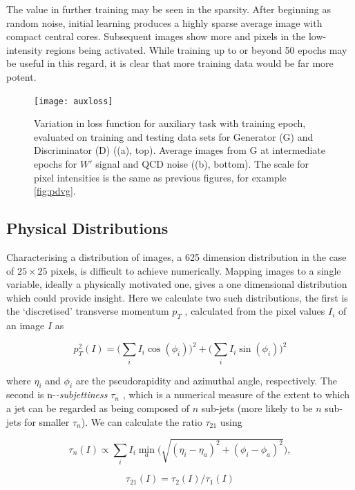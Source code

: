 \documentclass[twocolumn]{article}
\begin{document}
The value in further training may be seen in the sparsity. After beginning as random noise, initial learning produces a highly sparse average image with compact central cores. Subsequent images show more and pixels in the low-intensity regions being activated. While training up to or beyond 50 epochs may be useful in this regard, it is clear that more training data would be far more potent.

	\begin{figure}[!htbp]
		\centering
		\texttt{[image: auxloss]}
		
		\caption{Variation in loss function for auxiliary task with training epoch, evaluated on training and testing data sets for Generator (G) and Discriminator (D) ((a), top). Average images from G at intermediate epochs for $W'$ signal and QCD noise ((b), bottom). The scale for pixel intensities is the same as previous figures, for example \cref{fig:pdvg}.} 
		\label{fig:auxloss}
		
	\end{figure} 

\subsection{Physical Distributions}
\label{sec:physical}
Characterising a distribution of images, a 625 dimension distribution in the case of $25\times25$ pixels, is difficult to achieve numerically. Mapping images to a single variable, ideally a physically motivated one, gives a one dimensional distribution which could provide insight. Here we calculate two such distributions, the first is the `discretised' transverse momentum $p_T$ \cite{de2017learning}, calculated from the pixel values $I_i$ of an image $I$ as 

$$
p_T^2(I) = \bigg(\sum_i I_i \cos(\phi_i)\bigg)^2 + \bigg(\sum_i I_i \sin(\phi_i)\bigg)^2
$$

where $\eta_i$ and $\phi_i$ are the pseudorapidity and azimuthal angle, respectively. The second is n-\textit{-subjettiness} $\tau_{n}$ \cite{nsubjettiness}, which is a numerical measure of the extent to which a jet can be regarded as being composed of $n$ sub-jets (more likely to be $n$ sub-jets for smaller $\tau_n$). We can calculate the ratio $\tau_{21}$ using

$$
\tau_n (I) \propto \sum_i I_i \min_a \bigg(\sqrt{(\eta_i - \eta_a)^2 + (\phi_i - \phi_a)^2}\bigg),
$$

$$
\tau_{21} (I) = \tau_2 (I) / \tau_1 (I)
$$
\end{document}
